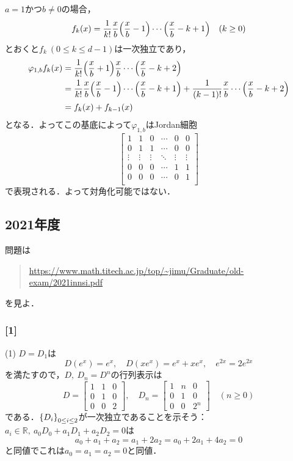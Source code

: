\documentclass[a4j]{ltjsarticle}
\newcommand{\Rset}{\mathbb{R}}
\newcommand{\1}{\mathbbm{1}}
\numberwithin{equation}{section}
\theoremstyle{definition}
\begin{document}
$a=1$かつ$b\neq0$の場合，
\begin{equation}
    f_k(x)=\frac{1}{k!}\frac{x}{b}\qty(\frac{x}{b}-1)\cdots\qty(\frac{x}{b}-k+1)\quad (k\geq0)
\end{equation}
とおくと$f_k\ (0\leq k\leq d-1)$は一次独立であり，
\begin{align}
    \varphi_{1,b}f_{k}(x)&=\frac{1}{k!}\qty(\frac{x}{b}+1)\frac{x}{b}\cdots\qty(\frac{x}{b}-k+2)\\
    &=\frac{1}{k!}\frac{x}{b}\qty(\frac{x}{b}-1)\cdots\qty(\frac{x}{b}-k+1)+\frac{1}{(k-1)!}\frac{x}{b}\cdots\qty(\frac{x}{b}-k+2)\\
    &=f_{k}(x)+f_{k-1}(x)
\end{align}
となる．よってこの基底によって$\varphi_{1,b}$はJordan細胞
\begin{equation}
    \begin{bmatrix}
        1 & 1 & 0 & \cdots & 0 & 0 \\
        0 & 1 & 1 & \cdots & 0 & 0 \\
        \vdots & \vdots & \vdots & \ddots & \vdots & \vdots \\
        0 & 0 & 0 & \cdots & 1 & 1 \\
        0 & 0 & 0 & \cdots & 0 & 1 \\
    \end{bmatrix}
\end{equation}
で表現される．よって対角化可能ではない．

\subsection{2021年度}
問題は
\begin{quote}
    \url{https://www.math.titech.ac.jp/top/~jimu/Graduate/old-exam/2021innsi.pdf}
\end{quote}
を見よ．
\subsubsection*{[1]}
(1) $D=D_1$は
\begin{equation}
    D(e^x)=e^x,\quad D(xe^x)=e^x+xe^x,\quad e^{2x}=2e^{2x} 
\end{equation}
を満たすので，$D,\ D_n=D^n$の行列表示は
\begin{equation}
    D=\begin{bmatrix}
        1 & 1 & 0 \\
        0 & 1 & 0 \\
        0 & 0 & 2 
    \end{bmatrix},\quad D_n=\begin{bmatrix}
        1 & n & 0 \\
        0 & 1 & 0 \\
        0 & 0 & 2^n  
    \end{bmatrix}\quad (n\geq0)
\end{equation}
である．$\qty{D_i}_{0\leq i\leq 2}$が一次独立であることを示そう：$a_i\in\Rset,\ a_0D_0+a_1D_1+a_2D_2=0$は
\begin{equation}
    a_0+a_1+a_2=a_1+2a_2=a_0+2a_1+4a_2=0 
\end{equation}
と同値でこれは$a_0=a_1=a_2=0$と同値．
\end{document}
